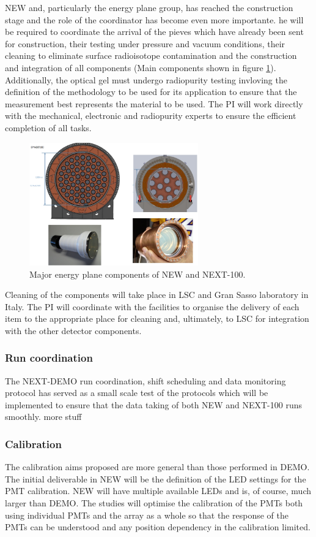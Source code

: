 \documentclass[a4paper,11pt,oneside]{article}
\begin{document}
NEW and, particularly the energy plane group, has reached the
construction stage and the role of the coordinator has become even
more importante. he will be required to coordinate the arrival of the
pieves which have already been sent for construction, their testing
under pressure and vacuum conditions, their cleaning to eliminate
surface radioisotope contamination and the construction and
integration of all components (Main components shown in figure \ref{fig:EPlane}). Additionally, the optical gel must
undergo radiopurity testing invloving the definition of the
methodology to be used for its application to ensure that the
measurement best represents the material to be used. The PI will work
directly with the mechanical, electronic and radiopurity experts to
ensure the efficient completion of all tasks.
\begin{figure}
  \begin{center}
    \includegraphics[width=0.65\textwidth]{img/EP.jpg}
  \end{center}
  \caption{Major energy plane components of NEW and NEXT-100.}
  \label{fig:EPlane}
\end{figure}
Cleaning of the components will take place in LSC and Gran Sasso
laboratory in Italy. The PI will coordinate with the facilities to
organise the delivery of each item to the appropriate place for
cleaning and, ultimately, to LSC for integration with the other
detector components.

\subsubsection*{Run coordination}
The NEXT-DEMO run coordination, shift scheduling and data monitoring
protocol has served as a small scale test of the protocols which will
be implemented to ensure that the data taking of both NEW and NEXT-100
runs smoothly. more stuff

\subsubsection*{Calibration}
The calibration aims proposed are more general than those performed in
DEMO. The initial deliverable in NEW will be the definition of the LED
settings for the PMT calibration. NEW will have multiple available
LEDs and is, of course, much larger than DEMO. The studies will
optimise the calibration of the PMTs both using individual PMTs and
the array as a whole so that the response of the PMTs can be
understood and any position dependency in the calibration limited.
\end{document}
